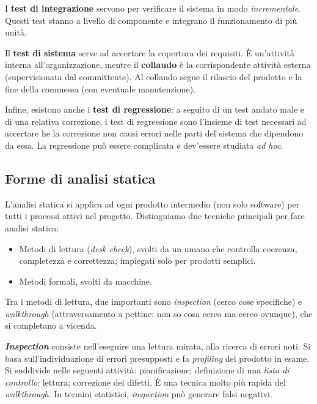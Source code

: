 \documentclass[a4paper]{article}
\begin{document}
I \textbf{test di integrazione} servono per verificare il sistema in modo \emph{incrementale}. Questi test stanno a livello di componente e integrano il funzionamento di più unità.
		
Il \textbf{test di sistema} serve ad accertare la copertura dei requisiti. È un'attività interna all'organizzazione, mentre il \textbf{collaudo} è la corrispondente attività esterna (supervisionata dal committente). Al collaudo segue il rilascio del prodotto e la fine della commessa (con eventuale manutenzione).
		
Infine, esistono anche i \textbf{test di regressione}: a seguito di un test andato male e di una relativa correzione, i test di regressione sono l'insieme di test necessari ad accertare he la correzione non causi errori nelle parti del sistema che dipendono da essa. La regressione può essere complicata e dev'essere studiata \emph{ad hoc}.

		
	\subsection{Forme di analisi statica}

		
L'analisi statica si applica ad ogni prodotto intermedio (non solo software) per tutti i processi attivi nel progetto. Distinguiamo due tecniche principali per fare analisi statica:
		
	\begin{itemize}
		
			
	\item Metodi di lettura (\emph{desk check}), svolti da un umano che controlla coerenza, completezza e correttezza; impiegati solo per prodotti semplici.
			
	\item Metodi formali, svolti da macchine.
		
	\end{itemize}

		
Tra i metodi di lettura, due importanti sono \emph{inspection} (cerco cose specifiche) e \emph{walkthrough} (attraversamento a pettine: non so cosa cerco ma cerco ovunque), che si completano a vicenda.
		
\textbf{\emph{Inspection}} consiste nell'eseguire una lettura mirata, alla ricerca di errori noti. Si basa sull'individuazione di errori presupposti e fa \emph{profiling} del prodotto in esame. Si suddivide nelle seguenti attività: pianificazione; definizione di una \emph{lista di controllo}; lettura; correzione dei difetti. È una tecnica molto più rapida del \emph{walkthrough}. In termini statistici, \emph{inspection} può generare falsi negativi.
		
\end{document}
